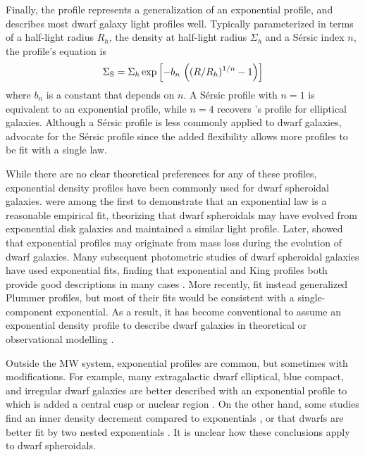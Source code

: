 Finally, the \citet{sersic1963} profile represents a generalization of
an exponential profile, and describes most dwarf galaxy light profiles
well. Typically parameterized in terms of a half-light radius \(R_h\),
the density at half-light radius \(\Sigma_h\) and a Sérsic index \(n\),
the profile's equation is \begin{equation}{
\Sigma_{\rm S} = \Sigma_h \exp\left[-b_n \,  \left((R/R_h)^{1/n} - 1\right)\right]
}\end{equation} where \(b_n\) is a constant that depends on \(n\). A
Sérsic profile with \(n=1\) is equivalent to an exponential profile,
while \(n=4\) recovers \citet{devaucouleurs1948}'s profile for
elliptical galaxies. Although a Sérsic profile is less commonly applied
to dwarf galaxies, \citet{munoz+2018} advocate for the Sérsic profile
since the added flexibility allows more profiles to be fit with a single
law.

While there are no clear theoretical preferences for any of these
profiles, exponential density profiles have been commonly used for dwarf
spheroidal galaxies. \citet{faber+lin1983} were among the first to
demonstrate that an exponential law is a reasonable empirical fit,
theorizing that dwarf spheroidals may have evolved from exponential disk
galaxies and maintained a similar light profile. Later,
\citet{read+gilmore2005} showed that exponential profiles may originate
from mass loss during the evolution of dwarf galaxies. Many subsequent
photometric studies of dwarf spheroidal galaxies have used exponential
fits, finding that exponential and King profiles both provide good
descriptions in many cases
\citep{binggeli+sandage+tarenghi1984, mateo1998, mcconnachie+irwin2006, cicuendez+2018}.
More recently, \citet{moskowitz+walker2020} fit instead generalized
Plummer profiles, but most of their fits would be consistent with a
single-component exponential. As a result, it has become conventional to
assume an exponential density profile to describe dwarf galaxies in
theoretical or observational modelling
\citep[e.g.,][]{kowalczyk+2013, martin+2016, MV2020a, battaglia+2022}.

Outside the MW system, exponential profiles are common, but sometimes
with modifications. For example, many extragalactic dwarf elliptical,
blue compact, and irregular dwarf galaxies are better described with an
exponential profile to which is added a central cusp or nuclear region
\citep{caldwell+bothun1987, noeske+2003}. On the other hand, some
studies find an inner density decrement compared to exponentials
\citep[e.g.,][]{caldwell+1992, makarov+2012}, or that dwarfs are better
fit by two nested exponentials
\citep[e.g.,][]{aparicio+1997, graham+guzman2003, hunter+elmegreen2006, lee+2018}.
It is unclear how these conclusions apply to dwarf spheroidals.

